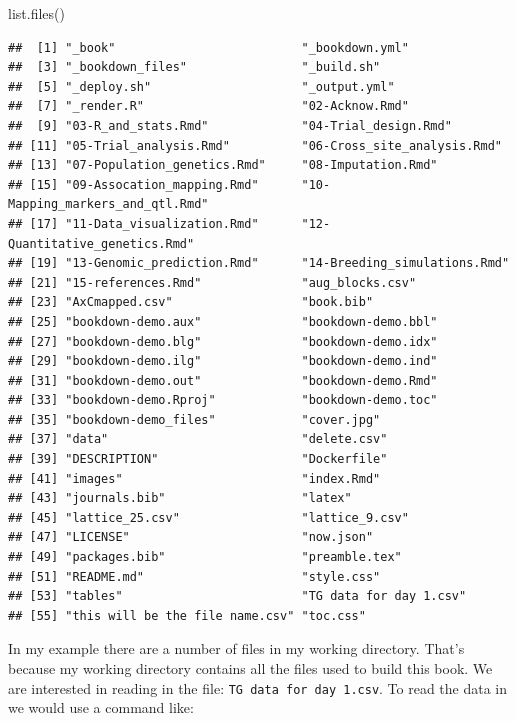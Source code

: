 \documentclass[
]{book}
\newenvironment{Shaded}{\begin{snugshade}}{\end{snugshade}}
\newcommand{\FunctionTok}[1]{\textcolor[rgb]{0.00,0.00,0.00}{#1}}
\newcommand{\NormalTok}[1]{#1}
\begin{document}
\begin{Shaded}
\begin{Highlighting}[]
\FunctionTok{list.files}\NormalTok{()}
\end{Highlighting}
\end{Shaded}

\begin{verbatim}
##  [1] "_book"                          "_bookdown.yml"                 
##  [3] "_bookdown_files"                "_build.sh"                     
##  [5] "_deploy.sh"                     "_output.yml"                   
##  [7] "_render.R"                      "02-Acknow.Rmd"                 
##  [9] "03-R_and_stats.Rmd"             "04-Trial_design.Rmd"           
## [11] "05-Trial_analysis.Rmd"          "06-Cross_site_analysis.Rmd"    
## [13] "07-Population_genetics.Rmd"     "08-Imputation.Rmd"             
## [15] "09-Assocation_mapping.Rmd"      "10-Mapping_markers_and_qtl.Rmd"
## [17] "11-Data_visualization.Rmd"      "12-Quantitative_genetics.Rmd"  
## [19] "13-Genomic_prediction.Rmd"      "14-Breeding_simulations.Rmd"   
## [21] "15-references.Rmd"              "aug_blocks.csv"                
## [23] "AxCmapped.csv"                  "book.bib"                      
## [25] "bookdown-demo.aux"              "bookdown-demo.bbl"             
## [27] "bookdown-demo.blg"              "bookdown-demo.idx"             
## [29] "bookdown-demo.ilg"              "bookdown-demo.ind"             
## [31] "bookdown-demo.out"              "bookdown-demo.Rmd"             
## [33] "bookdown-demo.Rproj"            "bookdown-demo.toc"             
## [35] "bookdown-demo_files"            "cover.jpg"                     
## [37] "data"                           "delete.csv"                    
## [39] "DESCRIPTION"                    "Dockerfile"                    
## [41] "images"                         "index.Rmd"                     
## [43] "journals.bib"                   "latex"                         
## [45] "lattice_25.csv"                 "lattice_9.csv"                 
## [47] "LICENSE"                        "now.json"                      
## [49] "packages.bib"                   "preamble.tex"                  
## [51] "README.md"                      "style.css"                     
## [53] "tables"                         "TG data for day 1.csv"         
## [55] "this will be the file name.csv" "toc.css"
\end{verbatim}

In my example there are a number of files in my working directory. That's because my working directory contains all the files used to build this book. We are interested in reading in the file: \texttt{TG\ data\ for\ day\ 1.csv}. To read the data in we would use a command like:
\end{document}
